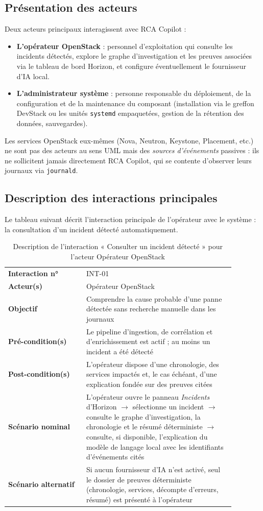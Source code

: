 \documentclass[a4paper,11pt,oneside]{report}
\begin{document}
\subsection{Présentation des acteurs}
Deux acteurs principaux interagissent avec RCA Copilot :
\begin{itemize}
    \item \textbf{L'opérateur OpenStack} : personnel d'exploitation qui consulte les incidents détectés, explore le graphe d'investigation et les preuves associées via le tableau de bord Horizon, et configure éventuellement le fournisseur d'IA local.
    \item \textbf{L'administrateur système} : personne responsable du déploiement, de la configuration et de la maintenance du composant (installation via le greffon DevStack ou les unités \texttt{systemd} empaquetées, gestion de la rétention des données, sauvegardes).
\end{itemize}
Les services OpenStack eux-mêmes (Nova, Neutron, Keystone, Placement, etc.) ne sont pas des acteurs au sens UML mais des \emph{sources d'événements} passives : ils ne sollicitent jamais directement RCA Copilot, qui se contente d'observer leurs journaux via \texttt{journald}.

\subsection{Description des interactions principales}
Le tableau suivant décrit l'interaction principale de l'opérateur avec le système : la consultation d'un incident détecté automatiquement.

\begin{table}[htbp]
\centering
\caption{Description de l'interaction « Consulter un incident détecté » pour l'acteur Opérateur OpenStack}
\begin{tabular}{p{0.30\linewidth} p{0.58\linewidth}}
\toprule
\textbf{Interaction n°} & INT-01 \\
\textbf{Acteur(s)} & Opérateur OpenStack \\
\textbf{Objectif} & Comprendre la cause probable d'une panne détectée sans recherche manuelle dans les journaux \\
\textbf{Pré-condition(s)} & Le pipeline d'ingestion, de corrélation et d'enrichissement est actif ; au moins un incident a été détecté \\
\textbf{Post-condition(s)} & L'opérateur dispose d'une chronologie, des services impactés et, le cas échéant, d'une explication fondée sur des preuves citées \\
\textbf{Scénario nominal} & L'opérateur ouvre le panneau \emph{Incidents} d'Horizon $\to$ sélectionne un incident $\to$ consulte le graphe d'investigation, la chronologie et le résumé déterministe $\to$ consulte, si disponible, l'explication du modèle de langage local avec les identifiants d'événements cités \\
\textbf{Scénario alternatif} & Si aucun fournisseur d'IA n'est activé, seul le dossier de preuves déterministe (chronologie, services, décompte d'erreurs, résumé) est présenté à l'opérateur \\
\bottomrule
\end{tabular}
\end{table}
\end{document}
